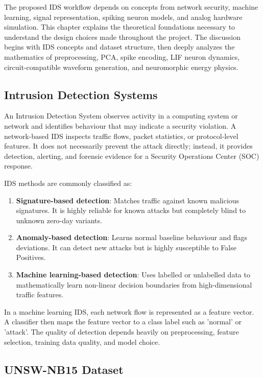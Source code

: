 \documentclass{ieeeaccess}
\begin{document}
The proposed IDS workflow depends on concepts from network security, machine learning, signal representation, spiking neuron models, and analog hardware simulation. This chapter explains the theoretical foundations necessary to understand the design choices made throughout the project. The discussion begins with IDS concepts and dataset structure, then deeply analyzes the mathematics of preprocessing, PCA, spike encoding, LIF neuron dynamics, circuit-compatible waveform generation, and neuromorphic energy physics.

\subsection{Intrusion Detection Systems}

An Intrusion Detection System observes activity in a computing system or network and identifies behaviour that may indicate a security violation. A network-based IDS inspects traffic flows, packet statistics, or protocol-level features. It does not necessarily prevent the attack directly; instead, it provides detection, alerting, and forensic evidence for a Security Operations Center (SOC) response.

IDS methods are commonly classified as:
\begin{enumerate}
\item \textbf{Signature-based detection}: Matches traffic against known malicious signatures. It is highly reliable for known attacks but completely blind to unknown zero-day variants.
\item \textbf{Anomaly-based detection}: Learns normal baseline behaviour and flags deviations. It can detect new attacks but is highly susceptible to False Positives.
\item \textbf{Machine learning-based detection}: Uses labelled or unlabelled data to mathematically learn non-linear decision boundaries from high-dimensional traffic features.
\end{enumerate}

In a machine learning IDS, each network flow is represented as a feature vector. A classifier then maps the feature vector to a class label such as 'normal' or 'attack'. The quality of detection depends heavily on preprocessing, feature selection, training data quality, and model choice.

\subsection{UNSW-NB15 Dataset}
\end{document}
